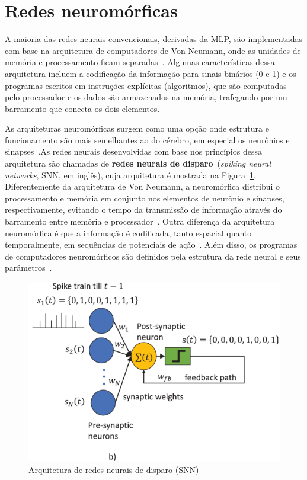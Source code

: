 \section{Redes neuromórficas}\label{sec:redesneuromorficas}
A maioria das redes neurais convencionais, derivadas da MLP, são implementadas com base na arquitetura de computadores de Von Neumann, onde as unidades de memória e processamento ficam separadas~\cite{von_neumann_first_1993}. Algumas características dessa arquitetura incluem a codificação da informação para sinais binários (0 e 1) e os programas escritos em instruções explícitas (algoritmos), que são computadas pelo processador e os dados são armazenados na memória, trafegando por um barramento que conecta os dois elementos.

As arquiteturas neuromórficas surgem como uma opção onde estrutura e funcionamento são mais semelhantes ao do cérebro, em especial os neurônios e sinapses~\cite{ivanov_neuromorphic_2022}.As redes neurais desenvolvidas com base nos princípios dessa arquitetura são chamadas de \textbf{redes neurais de disparo}~(\textit{spiking neural networks}, SNN, em inglês), cuja arquitetura é mostrada na Figura~\ref{fig:snn}. Diferentemente da arquitetura de Von Neumann, a neuromórfica distribui o processamento e memória em conjunto nos elementos de neurônio e sinapses, respectivamente, evitando o tempo da transmissão de informação através do barramento entre memória e processador~\cite{indiveri_memory_2015}. Outra diferença da arquitetura neuromórfica é que a informação é codificada, tanto espacial quanto temporalmente, em sequências de potenciais de ação~\cite{frenkel_bottom-up_2023}. Além disso, os programas de computadores neuromórficos são definidos pela estrutura da rede neural e seus parâmetros~\cite{schuman_opportunities_2022}.
\begin{figure}[tb]
	\centering
	\caption[Arquitetura de redes neurais de disparo (SNN)]{Arquitetura de redes neurais de disparo (SNN)}
	\label{fig:snn}
	\includegraphics[width=0.7\linewidth]{figs/snn}
\end{figure}


